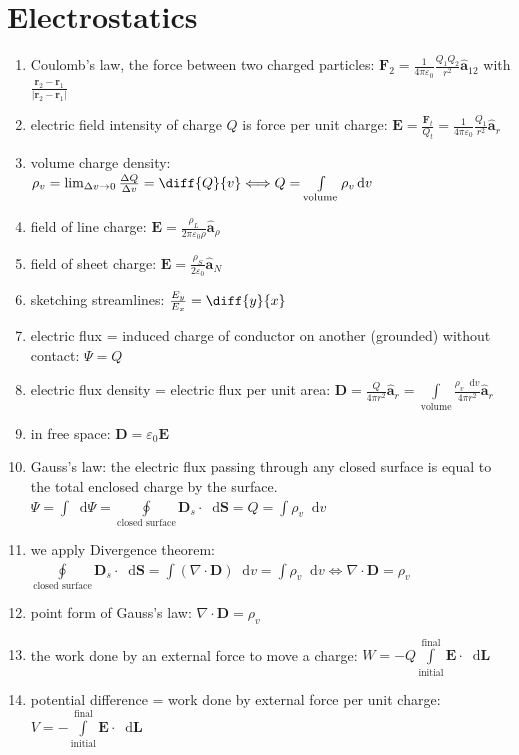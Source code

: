 \documentclass[a4paper,11pt]{article}
\newcommand*\dd{\mathop{}\!\mathrm{d}}
\newcommand{\divr}{\nabla \cdot}
\newcommand{\bvec}[1]{\mathbf{#1}}
\newcommand{\uvec}[1]{\hat{\mathbf{a}}_{#1} }
\begin{document}
	\section{Electrostatics}
	\begin{enumerate}
		\item Coulomb's law, the force between two charged particles: $\displaystyle \bvec{F}_2 = \frac{1}{4\pi\varepsilon_0}\frac{Q_1Q_2}{r^2}\uvec{12}$ with $\frac{\bvec{r}_2 - \bvec{r}_1}{ \left|\bvec{r}_2 - \bvec{r}_1\right|}$
		\item electric field intensity of charge $Q$ is force per unit charge: $\bvec{E} = \frac{\bvec{F}_t}{Q_t} = \frac{1}{4\pi\varepsilon_0}\frac{Q_1}{r^2}\uvec{r} $
		\item volume charge density: $\rho_v = \lim_{\Delta v \to 0} \frac{\Delta Q}{\Delta v} = \diff{Q}{v} \Longleftrightarrow Q = \int\limits_\text{volume} \rho_v \dd v$ 
		\item field of line charge: $\bvec{E} = \frac{\rho_L}{2\pi\varepsilon_0\rho}\uvec{\rho}$
		\item field of sheet charge: $\bvec{E} = \frac{\rho_S}{2\varepsilon_0}\uvec{N}$
		\item sketching streamlines: $\frac{E_y}{E_x} = \diff{y}{x}$
		\item electric flux = induced charge of conductor on another (grounded) without contact: $\Psi = Q$
		\item electric flux density = electric flux per unit area: $\bvec{D} = \frac{Q}{4\pi r^2}\uvec{r} = \int\limits_\text{volume} \frac{\rho_v \dd v}{4\pi r^2} \uvec{r}$
		\item in free space: $\bvec{D} = \varepsilon_0\bvec{E}$
		\item Gauss's law: the electric flux passing through any closed surface is equal to the total enclosed charge by the surface. $\Psi = \int \dd \Psi = \oint\limits_\text{closed surface} \bvec{D}_s \cdot \dd \bvec{S} = Q = \int \rho_v \dd v$
		\item we apply Divergence theorem: $\oint\limits_\text{closed surface} \bvec{D}_s \cdot \dd \bvec{S} = \int (\divr\bvec{D}) \dd v = \int \rho_v \dd v \Longleftrightarrow \divr \bvec{D} = \rho_v$
		\item point form of Gauss's law: $\boxed{\divr \bvec{D} = \rho_v}$
		\item the work done by an external force to move a charge: $W = -Q\int\limits_\text{initial}^\text{final} \bvec{E} \cdot \dd \bvec{L}$ 
		\item potential difference = work done by external force per unit charge: $V = -\int\limits_\text{initial}^\text{final} \bvec{E} \cdot \dd\bvec{L}$

\end{enumerate}
\end{document}
